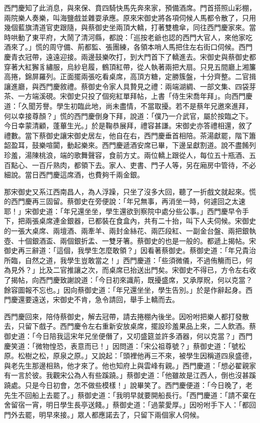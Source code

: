 \begin{showcontents}{}
西門慶知了此消息，與來保、賁四騎快馬先奔來家，預備酒席。門首搭照山彩棚，兩院樂人奏樂，叫海鹽戲並雜耍承應。原來宋御史將各項伺候人馬都令散了，只用幾個藍旗清道官吏跟隨，與蔡御史坐兩頂大轎，打著雙檐傘，同往西門慶家來。當時哄動了東平府，大鬧了清河縣，都說：「巡按老爺也認的西門大官人，來他家吃酒來了。」慌的周守備、荊都監、張團練，各領本哨人馬把住左右街口伺候。西門慶青衣冠帶，遠遠迎接。兩邊鼓樂吹打，到大門首下了轎進去。宋御史與蔡御史都穿著大紅獬豸繡服，烏紗皂履，鶴頂紅帶，從人執著兩把大扇。只見五間廳上湘簾高捲，錦屏羅列。正面擺兩張吃看桌席，高頂方糖，定勝簇盤，十分齊整。二官揖讓進廳，與西門慶敘禮。蔡御史令家人具贄見之禮：兩端湖綢、一部文集、四袋芽茶、一方端溪硯。宋御史只投了個宛紅單拜帖，上書「侍生宋喬年拜」。向西門慶道：「久聞芳譽。學生初臨此地，尚未盡情，不當取擾。若不是蔡年兄邀來進拜，何以幸接尊顏？」慌的西門慶倒身下拜，說道：「僕乃一介武官，屬於按臨之下。今日幸蒙清顧，蓬蓽生光。」於是鞠恭展拜，禮容甚謙。宋御史亦答禮相還，敘了禮數。當下蔡御史讓宋御史居左，他自在右，西門慶垂首相陪。茶湯獻罷，階下簫韶盈耳，鼓樂喧闐，動起樂來。西門慶遞酒安席已畢，下邊呈獻割道。說不盡餚列珍羞，湯陳桃浪，端的歌舞聲容，食前方丈。兩位轎上跟從人，每位五十瓶酒、五百點心、一百斤熟肉，都領下去。家人、吏書、門子人等，另在廂房中管待，不必細說。當日西門慶這席酒，也費夠千兩金銀。

那宋御史又系江西南昌人，為人浮躁，只坐了沒多大回，聽了一折戲文就起來。慌的西門慶再三固留。蔡御史在旁便說：「年兄無事，再消坐一時，何遽回之太速耶！」宋御史道：「年兄還坐坐，學生還欲到察院中處分些公事。」西門慶早令手下，把兩張桌席連金銀器，已都裝在食盒內，共有二十抬，叫下人夫伺候。宋御史的一張大桌席、兩壇酒、兩牽羊、兩封金絲花、兩匹段紅、一副金台盤、兩把銀執壺、十個銀酒盃、兩個銀折盂、一雙牙箸。蔡御史的也是一般的。都遞上揭帖。宋御史再三辭道：「這個，我學生怎麼敢領？」因看著蔡御史。蔡御史道：「年兄貴治所臨，自然之道，我學生豈敢當之！」西門慶道：「些須微儀，不過侑觴而已，何為見外？」比及二官推讓之次，而桌席已抬送出門矣。宋御史不得已，方令左右收了揭帖，向西門慶致謝說道：「今日初來識荊，既擾盛席，又承厚貺，何以克當？餘容圖報不忘也。」因向蔡御史道：「年兄還坐坐，學生告別。」於是作辭起身。西門慶還要遠送，宋御史不肯，急令請回，舉手上轎而去。

西門慶回來，陪侍蔡御史，解去冠帶，請去捲棚內後坐。因吩咐把樂人都打發散去，只留下戲子。西門慶令左右重新安放桌席，擺設珍羞果品上來，二人飲酒。蔡御史道：「今日陪我這宋年兄坐便僭了，又叨盛筵並許多酒器，何以克當？」西門慶笑道：「微物惶恐，表意而已！」因問道：「宋公祖尊號？」蔡御史道：「號松原。松樹之松，原泉之原。」又說起：「頭裡他再三不來，被學生因稱道四泉盛德，與老先生那邊相熟，他才來了。他也知府上與雲峰有親。」西門慶道：「想必翟親家有一言於彼。我觀宋公為人有些蹊蹺。」蔡御史道：「他雖故是江西人，倒也沒甚蹊蹺處。只是今日初會，怎不做些模樣！」說畢笑了。西門慶便道：「今日晚了，老先生不回船上去罷了。」蔡御史道：「我明早就要開船長行。「西門慶道：「請不棄在舍留宿一宵，明日學生長亭送餞。」蔡御史道：「過蒙愛厚。」因吩咐手下人：「都回門外去罷，明早來接。」眾人都應諾去了，只留下兩個家人伺候。


\end{showcontents}
